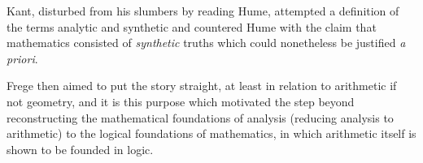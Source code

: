 Kant, disturbed from his slumbers by reading Hume, attempted a definition of the terms analytic and synthetic and countered Hume with the claim that mathematics consisted of {\it synthetic} truths which could nonetheless be justified {\it a priori}. 

Frege then aimed to put the story straight, at least in relation to arithmetic if not geometry, and it is this purpose which motivated the step beyond reconstructing the mathematical foundations of analysis (reducing analysis to arithmetic) to the logical foundations of mathematics, in which arithmetic itself is shown to be founded in logic.









